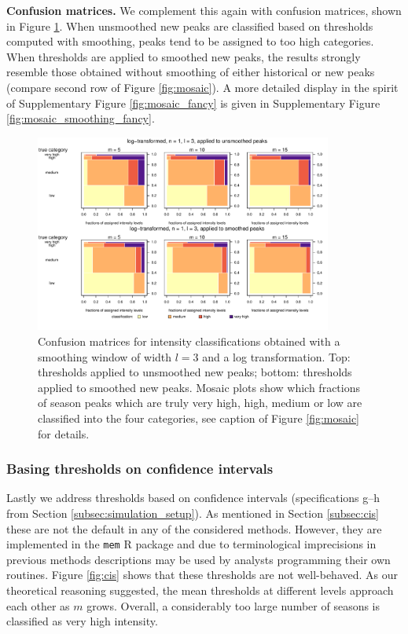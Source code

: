 \documentclass{article}
\begin{document}
\textbf{Confusion matrices.} We complement this again with confusion matrices, shown in Figure \ref{fig:mosaic_smoothing}. When unsmoothed new peaks are classified based on thresholds computed with smoothing, peaks tend to be assigned to too high categories. When thresholds are applied to smoothed new peaks, the results strongly resemble those obtained without smoothing of either historical or new peaks (compare second row of Figure \ref{fig:mosaic}). A more detailed display in the spirit of Supplementary Figure \ref{fig:mosaic_fancy} is given in Supplementary Figure \ref{fig:mosaic_smoothing_fancy}.


\begin{figure}[h!]
\begin{center}
\includegraphics[width=0.87\textwidth]{figure/mosaic_log_smoothed_fr.pdf}

\caption{Confusion matrices for intensity classifications obtained with a smoothing window of width $l = 3$ and a log transformation. Top: thresholds applied to unsmoothed new peaks; bottom: thresholds applied to smoothed new peaks. Mosaic plots show which fractions of season peaks which are truly very high, high, medium or low are classified into the four categories, see caption of Figure \ref{fig:mosaic} for details.}
\label{fig:mosaic_smoothing}
\end{center}
\end{figure}


\subsubsection{Basing thresholds on confidence intervals}

Lastly we address thresholds based on confidence intervals (specifications g--h from Section \ref{subsec:simulation_setup}). As mentioned in Section \ref{subsec:cis} these are not the default in any of the  considered methods. However, they are implemented in the \texttt{mem} R package and due to terminological imprecisions in previous methods descriptions may be used by analysts programming their own routines. Figure \ref{fig:cis} shows that these thresholds are not well-behaved. As our theoretical reasoning suggested, the mean thresholds at different levels approach each other as $m$ grows. Overall, a considerably too large number of seasons is classified as very high intensity.
\end{document}
